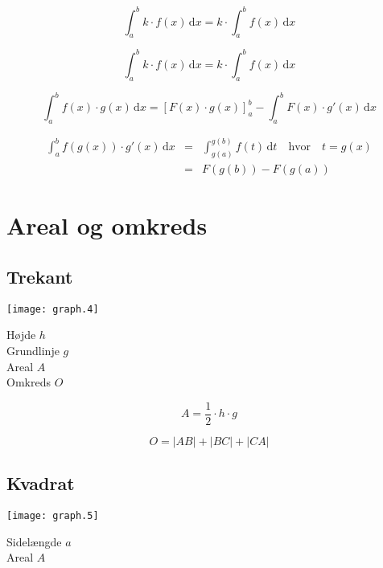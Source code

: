 \documentclass[11pt,a4paper,landscape,twocolumn,fleqn,leqno]{article}
\begin{document}
\begin{equation}
\int_a^b k \cdot f(x)\, \mathrm{d}x = k \cdot \int_a^b f(x)\, \mathrm{d}x
\end{equation}

\begin{equation}
\int_a^b k \cdot f(x)\, \mathrm{d}x = k \cdot \int_a^b f(x)\, \mathrm{d}x
\end{equation}

\begin{equation}
\int_a^b f(x) \cdot g(x)\, \mathrm{d}x = \left[F(x) \cdot g(x) \right]_a^b - \int_a^b F(x) \cdot g'(x)\, \mathrm{d}x
\end{equation}

\begin{eqnarray}
\int_a^b f(g(x)) \cdot g'(x)\, \mathrm{d}x & = & \int_{g(a)}^{g(b)} f(t)\, \mathrm{d}t  \quad \mbox{hvor} \quad t = g(x) \\
 & = & F(g(b)) - F(g(a)) \nonumber
\end{eqnarray}

\section{Areal og omkreds}

\subsection{Trekant}

\texttt{[image: graph.4]}

Højde $h$ \\
Grundlinje $g$ \\
Areal $A$ \\
Omkreds $O$

\begin{equation}
A = \frac{1}{2} \cdot h \cdot g
\end{equation}

\begin{equation}
O = |AB| + |BC| + |CA|
\end{equation}

\vfill

\subsection{Kvadrat}

\texttt{[image: graph.5]}

Sidelængde $a$ \\
Areal $A$
\end{document}
